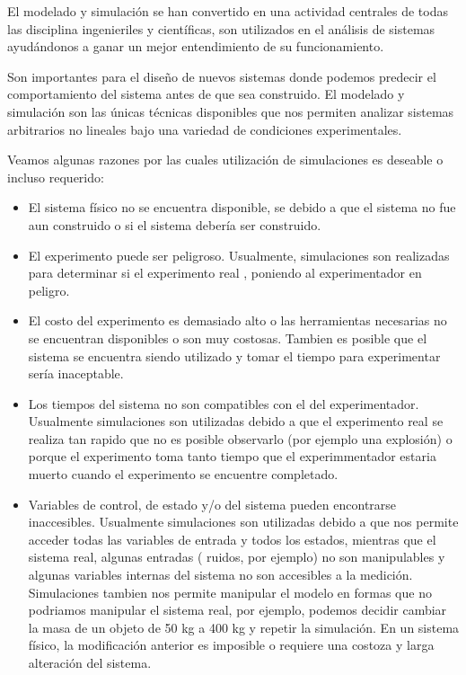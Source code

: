
El modelado y simulación se han convertido en una actividad centrales de todas las disciplina ingenieriles y científicas, son utilizados en el análisis de sistemas  ayudándonos a ganar un mejor entendimiento de su funcionamiento. 

Son importantes para el diseño de nuevos sistemas donde podemos predecir el comportamiento del sistema antes de que sea construido.
El modelado y simulación son las únicas técnicas disponibles que nos permiten analizar sistemas arbitrarios no lineales bajo una variedad de condiciones experimentales.

Veamos algunas razones por las cuales utilización de simulaciones es deseable o incluso requerido:

\begin{itemize}
	\item El sistema físico no se encuentra disponible, se debido a que el sistema no fue aun construido o si el sistema debería ser construido. 
	
	\item El experimento puede ser peligroso. Usualmente, simulaciones son realizadas para determinar si el experimento real , poniendo al experimentador en peligro.

	\item El costo del experimento es demasiado alto o las herramientas necesarias no se encuentran disponibles o son muy costosas. Tambien es posible que el sistema se encuentra siendo utilizado y tomar el tiempo para experimentar sería inaceptable.

	\item Los tiempos del sistema no son compatibles con el del experimentador. Usualmente simulaciones son utilizadas debido a que el experimento real se realiza tan rapido que no es posible observarlo (por ejemplo una explosión) o porque el experimento toma tanto tiempo que el experimmentador estaria muerto cuando el experimento se encuentre completado.

	\item Variables de control, de estado y/o del sistema pueden encontrarse inaccesibles. Usualmente simulaciones son utilizadas debido a que nos permite acceder todas las variables de entrada y todos los estados, mientras que el sistema real, algunas entradas ( ruidos, por ejemplo) no son manipulables y algunas variables internas del sistema no son accesibles a la medición. Simulaciones tambien nos permite manipular el modelo en formas que no podriamos manipular el sistema real, por ejemplo, podemos decidir cambiar la masa de un objeto de 50 kg a 400 kg y repetir la simulación. En un sistema físico, la modificación anterior es imposible o requiere una costoza y larga alteración del sistema.


\end{itemize}
